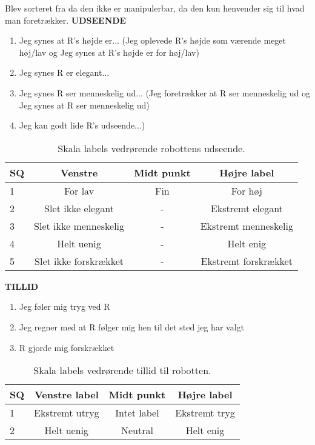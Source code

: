 Blev sorteret fra da den ikke er manipulerbar, da den kun henvender sig til hvad man foretrækker. \blankline
%
\textbf{UDSEENDE}
%
\begin{enumerate}
  \item Jeg synes at R's højde er... (Jeg oplevede R's højde som værende meget høj/lav og Jeg synes at R's højde er for høj/lav)
  \item Jeg synes R er elegant...
  \item Jeg synes R ser menneskelig ud... (Jeg foretrækker at R ser menneskelig ud og Jeg synes at R ser menneskelig ud)
  \item Jeg kan godt lide R's udseende...)\blankline
\end{enumerate}
%
\begin{table}[H]
	\centering
	\begin{tabular}{l|c|c|c}
		SQ     & Venstre & Midt punkt & Højre label \\\hline
		1   & For lav  & Fin & For høj        \\\hline
		2   & Slet ikke elegant & - & Ekstremt elegant         \\\hline
		3   & Slet ikke menneskelig & - & Ekstremt menneskelig         \\\hline
	 	4   & Helt uenig & - & Helt enig         \\\hline
		5   & Slet ikke forskrækket & -  & Ekstremt forskrækket           
	\end{tabular}  
	\caption{Skala labels vedrørende robottens udseende.}
	\label{tab:UdseendeSkala}       
\end{table}
\noindent
%
\textbf{TILLID}
%
\begin{enumerate}
  \item Jeg føler mig tryg ved R
  \item Jeg regner med at R følger mig hen til det sted jeg har valgt
  \item R gjorde mig forskrækket\blankline
\end{enumerate}
%
\begin{table}[H]
	\centering 
	\begin{tabular}{l|c|c|c}
		SQ  & Venstre label & Midt punkt & Højre label \\\hline
		1   & Ekstremt utryg & Intet label & Ekstremt tryg  \\\hline
		2   & Helt uenig & Neutral & Helt enig 
	\end{tabular} 
	\caption{Skala labels vedrørende tillid til robotten.}
	\label{tab:TillidSkala}       
\end{table}
